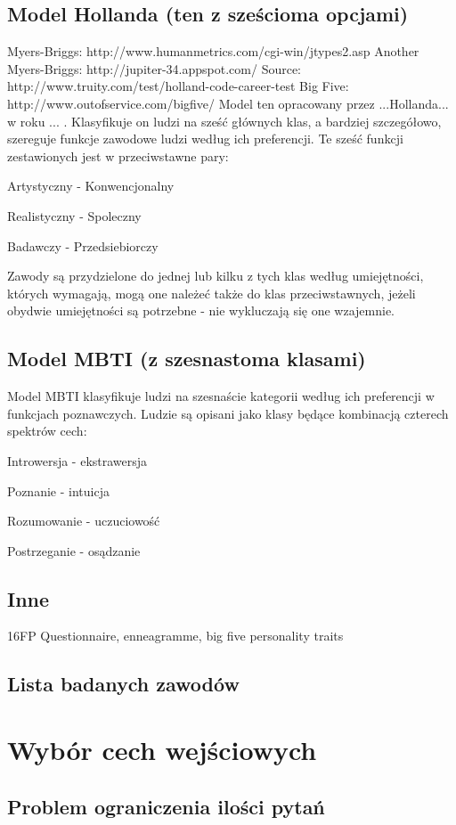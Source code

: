 \documentclass[12pt,a4paper,oneside]{report} %
\begin{document}
\section{Model Hollanda (ten z sześcioma opcjami)}
Myers-Briggs: http://www.humanmetrics.com/cgi-win/jtypes2.asp
Another Myers-Briggs: http://jupiter-34.appspot.com/
Source: http://www.truity.com/test/holland-code-career-test
Big Five: http://www.outofservice.com/bigfive/
Model ten opracowany przez ...Hollanda... w roku ... . Klasyfikuje on ludzi na sześć głównych klas, a bardziej szczegółowo, szereguje funkcje zawodowe ludzi według ich preferencji. Te sześć funkcji zestawionych jest w przeciwstawne pary:\par
Artystyczny - Konwencjonalny\par
Realistyczny - Spoleczny\par
Badawczy - Przedsiebiorczy\par
Zawody są przydzielone do jednej lub kilku z tych klas według umiejętności, których wymagają, mogą one należeć także do klas przeciwstawnych, jeżeli obydwie umiejętności są potrzebne - nie wykluczają się one wzajemnie.\par
\section{Model MBTI (z szesnastoma klasami)}
Model MBTI klasyfikuje ludzi na szesnaście kategorii według ich preferencji w funkcjach poznawczych. Ludzie są opisani jako klasy będące kombinacją czterech spektrów cech:\par
Introwersja - ekstrawersja\par
Poznanie - intuicja\par
Rozumowanie - uczuciowość\par
Postrzeganie - osądzanie\par
\section{Inne}
16FP Questionnaire, enneagramme, big five personality traits
\section{Lista badanych zawodów}
\chapter{Wybór cech wejściowych}
\section{Problem ograniczenia ilości pytań}
\end{document}
